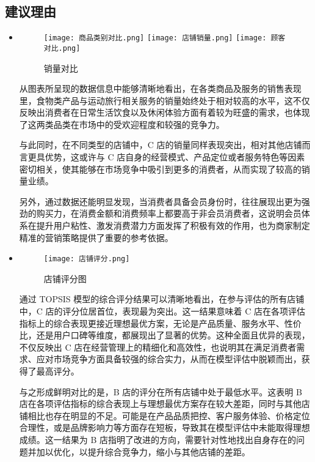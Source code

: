 \documentclass[withoutpreface,bwprint]{cumcmthesis}
\begin{document}
\subsection{建议理由}
\begin{itemize}
    \item 
    \begin{figure}[H]
    \centering
    {\texttt{[image: 商品类别对比.png]}}
    {\texttt{[image: 店铺销量.png]}}
    {\texttt{[image: 顾客对比.png]}}
    \caption{销量对比}\label{fig:双图}
    \end{figure} 
   从图表所呈现的数据信息中能够清晰地看出，在各类商品及服务的销售表现里，食物类产品与运动旅行相关服务的销量始终处于相对较高的水平，这不仅反映出消费者在日常生活饮食以及休闲体验方面有着较为旺盛的需求，也体现了这两类品类在市场中的受欢迎程度和较强的竞争力。
\par 与此同时，在不同类型的店铺中，C 店的销量同样表现突出，相对其他店铺而言更具优势，这或许与 C 店自身的经营模式、产品定位或者服务特色等因素密切相关，使其能够在市场竞争中吸引到更多的消费者，从而实现了较高的销量业绩。
\par 另外，通过数据还能明显发现，当消费者具备会员身份时，往往展现出更为强劲的购买力，在消费金额和消费频率上都要高于非会员消费者，这说明会员体系在提升用户粘性、激发消费潜力方面发挥了积极有效的作用，也为商家制定精准的营销策略提供了重要的参考依据。
    
    \item     
    \begin{figure}[H]
    \centering
    \texttt{[image: 店铺评分.png]}
    \caption{店铺评分图}\label{fig:双图}
    \end{figure} 
    通过 TOPSIS 模型的综合评分结果可以清晰地看出，在参与评估的所有店铺中，C 店的评分位居首位，表现最为突出。这一结果意味着 C 店在各项评估指标上的综合表现更接近理想最优方案，无论是产品质量、服务水平、性价比，还是用户口碑等维度，都展现出了显著的优势。这种全面且优异的表现，不仅反映出 C 店在经营管理上的精细化和高效性，也说明其在满足消费者需求、应对市场竞争方面具备较强的综合实力，从而在模型评估中脱颖而出，获得了最高评分。
\par 与之形成鲜明对比的是，B 店的评分在所有店铺中处于最低水平。这表明 B 店在各项评估指标的综合表现上与理想最优方案存在较大差距，同时与其他店铺相比也存在明显的不足。可能是在产品品质把控、客户服务体验、价格定位合理性，或是品牌影响力等方面存在短板，导致其在模型评估中未能取得理想成绩。这一结果为 B 店指明了改进的方向，需要针对性地找出自身存在的问题并加以优化，以提升综合竞争力，缩小与其他店铺的差距。

\end{itemize}
\end{document}
